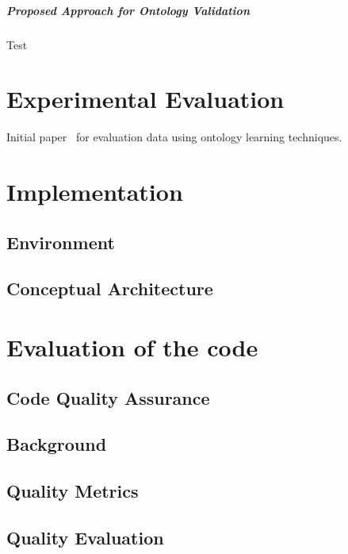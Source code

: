 \documentclass[draft,final]{vutinfth} %
\begin{document}
\paragraph{Proposed Approach for Ontology Validation} Test



\chapter{Experimental Evaluation}
Initial paper~\cite{liu2005semi} for evaluation data using ontology learning techniques.


\chapter{Implementation}\label{chap:implementation}
\section{Environment}
\section{Conceptual Architecture}




\chapter{Evaluation of the code}
\section{Code Quality Assurance}
\section{Background}
\section{Quality Metrics}
\section{Quality Evaluation}
\end{document}
